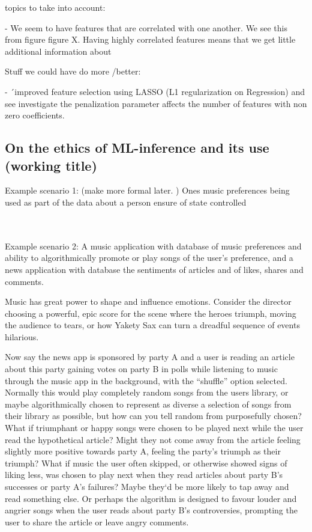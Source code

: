 \documentclass{article}
\begin{document}
    
    
    topics to take into account:
    
    - We seem to have features that are correlated with one another. We see this from figure figure X. Having highly correlated features means that we get little additional information about 
    
    Stuff we could have do more /better: \newline
    
    - ´improved feature selection using LASSO (L1 regularization on Regression) and see investigate the penalization parameter affects the number of features with non zero coefficients. 
    
    \subsection{On the ethics of ML-inference and its use (working title)}
    
    
    Example scenario 1: 
    (make more formal later. )
    Ones music preferences being used as part of the data about a person ensure of state controlled 
    
    
    \\
    \\
    Example scenario 2: 
    A music application with database of music preferences and ability to algorithmically promote or play songs of the user’s preference, and a news application with database the sentiments of articles and of likes, shares and comments.
    
    Music has great power to shape and influence emotions. Consider the director choosing a powerful, epic score for the scene where the heroes triumph, moving the audience to tears, or how Yakety Sax can turn a dreadful sequence of events hilarious. 
    
    Now say the news app is sponsored by party A and a user is reading an article about this party gaining votes on party B in polls while listening to music through the music app in the background, with the “shuffle” option selected. Normally this would play completely random songs from the users library, or maybe algorithmically chosen to represent as diverse a selection of songs from their library as possible, but how can you tell random from purposefully chosen? What if triumphant or happy songs were chosen to be played next while the user read the hypothetical article? Might they not come away from the article feeling slightly more positive towards party A, feeling the party’s triumph as their triumph? What if music the user often skipped, or otherwise showed signs of liking less, was chosen to play next when they read articles about party B’s successes or party A’s failures? Maybe they‘d be more likely to tap away and read something else. Or perhaps the algorithm is designed to favour louder and angrier songs when the user reads about party B’s controversies, prompting the user to share the article or leave angry comments.
    
\end{document}
